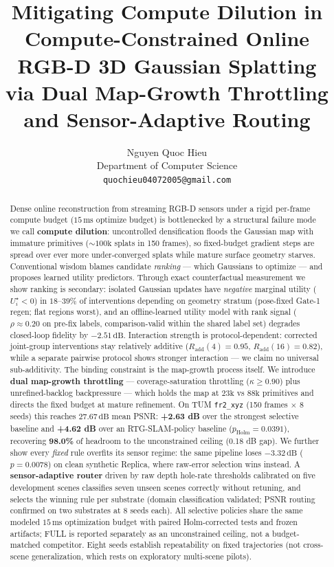 \documentclass[10pt,twocolumn,letterpaper]{article}
\title{\textbf{Mitigating Compute Dilution in Compute-Constrained Online RGB-D 3D Gaussian Splatting\\via Dual Map-Growth Throttling and Sensor-Adaptive Routing}}
\author{
Nguyen Quoc Hieu\\
Department of Computer Science\\
\texttt{quochieu04072005@gmail.com}
}
\date{}
\begin{document}
\maketitle

\begin{abstract}
Dense online reconstruction from streaming RGB-D sensors under a rigid per-frame compute budget ($15\,\mathrm{ms}$ optimize budget) is bottlenecked by a structural failure mode we call \textbf{compute dilution}: uncontrolled densification floods the Gaussian map with immature primitives ($\sim 100\mathrm{k}$ splats in 150 frames), so fixed-budget gradient steps are spread over ever more under-converged splats while mature surface geometry starves.
Conventional wisdom blames candidate \textit{ranking} --- which Gaussians to optimize --- and proposes learned utility predictors.
Through exact counterfactual measurement we show ranking is secondary: isolated Gaussian updates have \textit{negative} marginal utility ($U_i^\star < 0$) in $18$--$39\%$ of interventions depending on geometry stratum (pose-fixed Gate-1 regen; flat regions worst), and an offline-learned utility model with rank signal ($\rho \approx 0.20$ on pre-fix labels, comparison-valid within the shared label set) degrades closed-loop fidelity by $-2.51\,\mathrm{dB}$.
Interaction strength is protocol-dependent: corrected joint-group interventions stay relatively additive ($R_{\mathrm{add}}(4) = 0.95$, $R_{\mathrm{add}}(16) = 0.82$), while a separate pairwise protocol shows stronger interaction --- we claim no universal sub-additivity.
The binding constraint is the map-growth process itself.
We introduce \textbf{dual map-growth throttling} --- coverage-saturation throttling ($\kappa \ge 0.90$) plus unrefined-backlog backpressure --- which holds the map at $23\mathrm{k}$ vs $88\mathrm{k}$ primitives and directs the fixed budget at mature refinement.
On TUM \texttt{fr2\_xyz} (150 frames $\times$ 8 seeds) this reaches $27.67\,\mathrm{dB}$ mean PSNR: \textbf{+2.63 dB} over the strongest selective baseline and \textbf{+4.62 dB} over an RTG-SLAM-policy baseline ($p_{\mathrm{Holm}} = 0.0391$), recovering \textbf{98.0\%} of headroom to the unconstrained ceiling (0.18 dB gap).
We further show every \textit{fixed} rule overfits its sensor regime: the same pipeline loses $-3.32\,\mathrm{dB}$ ($p = 0.0078$) on clean synthetic Replica, where raw-error selection wins instead.
A \textbf{sensor-adaptive router} driven by raw depth hole-rate thresholds calibrated on five development scenes classifies seven unseen scenes correctly without retuning, and selects the winning rule per substrate (domain classification validated; PSNR routing confirmed on two substrates at 8 seeds each).
All selective policies share the same modeled $15\,\mathrm{ms}$ optimization budget with paired Holm-corrected tests and frozen artifacts; FULL is reported separately as an unconstrained ceiling, not a budget-matched competitor. Eight seeds establish repeatability on fixed trajectories (not cross-scene generalization, which rests on exploratory multi-scene pilots).
\end{abstract}
\end{document}
